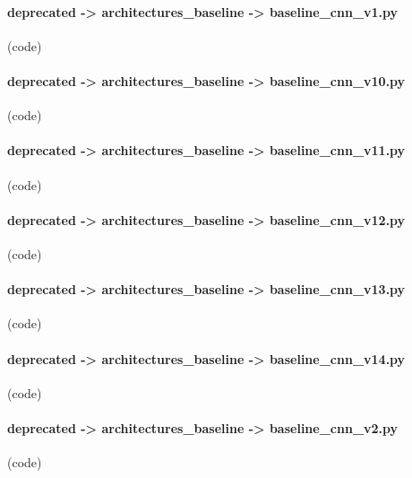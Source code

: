 \begin{myparindent}{0pt}
\noindent\paragraph[baseline\_cnn\_v1.py]{deprecated -> architectures\_baseline -> baseline\_cnn\_v1.py} (code)

\noindent\paragraph[baseline\_cnn\_v10.py]{deprecated -> architectures\_baseline -> baseline\_cnn\_v10.py} (code)

\noindent\paragraph[baseline\_cnn\_v11.py]{deprecated -> architectures\_baseline -> baseline\_cnn\_v11.py} (code)

\noindent\paragraph[baseline\_cnn\_v12.py]{deprecated -> architectures\_baseline -> baseline\_cnn\_v12.py} (code)

\noindent\paragraph[baseline\_cnn\_v13.py]{deprecated -> architectures\_baseline -> baseline\_cnn\_v13.py} (code)

\noindent\paragraph[baseline\_cnn\_v14.py]{deprecated -> architectures\_baseline -> baseline\_cnn\_v14.py} (code)

\noindent\paragraph[baseline\_cnn\_v2.py]{deprecated -> architectures\_baseline -> baseline\_cnn\_v2.py} (code)

\end{myparindent}
